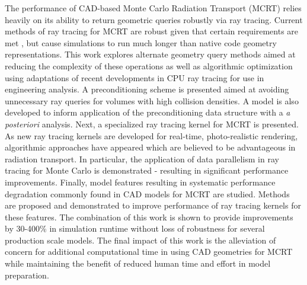 


The performance of CAD-based Monte Carlo Radiation Transport (MCRT) relies
heavily on its ability to return geometric queries robustly via ray
tracing. Current methods of ray tracing for MCRT are robust given that certain
requirements are met \cite{Smith_2011}, but cause simulations to run much longer
than native code geometry representations. This work explores alternate geometry
query methods aimed at reducing the complexity of these operations as well as
algorithmic optimization using adaptations of recent developments in CPU ray
tracing for use in engineering analysis. A preconditioning scheme is presented
aimed at avoiding unnecessary ray queries for volumes with high collision
densities. A model is also developed to inform application of the
preconditioning data structure with a \textit{a posteriori} analysis. Next, a
specialized ray tracing kernel for MCRT is presented. As new ray tracing kernels
are developed for real-time, photo-realistic rendering, algorithmic approaches
have appeared which are believed to be advantageous in radiation transport. In
particular, the application of data parallelism in ray tracing for Monte Carlo
is demonstrated - resulting in significant performance improvements. Finally,
model features resulting in systematic performance degradation commonly found in
CAD models for MCRT are studied. Methods are proposed and demonstrated to
improve performance of ray tracing kernels for these features. The combination
of this work is shown to provide improvements by 30-400\% in simulation runtime
without loss of robustness for several production scale models. The final impact
of this work is the alleviation of concern for additional computational time in
using CAD geometries for MCRT while maintaining the benefit of reduced human
time and effort in model preparation.
